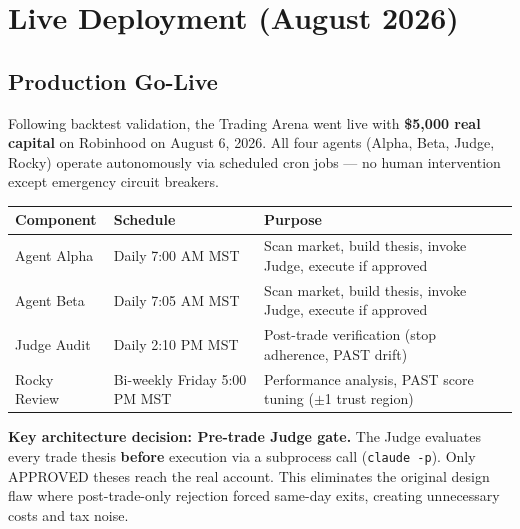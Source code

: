 \documentclass[11pt]{article}
\begin{document}
\section{Live Deployment (August 2026)}\label{live-deployment-august-2026}

\subsection{Production Go-Live}\label{production-go-live}

Following backtest validation, the Trading Arena went live with \textbf{\$5,000 real capital} on Robinhood on August 6, 2026. All four agents (Alpha, Beta, Judge, Rocky) operate autonomously via scheduled cron jobs --- no human intervention except emergency circuit breakers.

{\def\LTcaptype{none} %
{\small
\begin{longtable}{@{}
  >{\raggedright\arraybackslash}p{}
  >{\raggedright\arraybackslash}p{}
  >{\raggedright\arraybackslash}p{}@{}}
\toprule\noalign{}
\begin{minipage}[b]{\linewidth}\raggedright
Component
\end{minipage} & \begin{minipage}[b]{\linewidth}\raggedright
Schedule
\end{minipage} & \begin{minipage}[b]{\linewidth}\raggedright
Purpose
\end{minipage} \\
\midrule\noalign{}
\endhead
\bottomrule\noalign{}
\endlastfoot
\renewcommand{\arraystretch}{1.15}
Agent Alpha & Daily 7:00 AM MST & Scan market, build thesis, invoke Judge, execute if approved \\
Agent Beta & Daily 7:05 AM MST & Scan market, build thesis, invoke Judge, execute if approved \\
Judge Audit & Daily 2:10 PM MST & Post-trade verification (stop adherence, PAST drift) \\
Rocky Review & Bi-weekly Friday 5:00 PM MST & Performance analysis, PAST score tuning ($\pm$1 trust region) \\
\end{longtable}}
}

\textbf{Key architecture decision: Pre-trade Judge gate.} The Judge evaluates every trade thesis \textbf{before} execution via a subprocess call (\texttt{claude\ -p}). Only APPROVED theses reach the real account. This eliminates the original design flaw where post-trade-only rejection forced same-day exits, creating unnecessary costs and tax noise.
\end{document}
